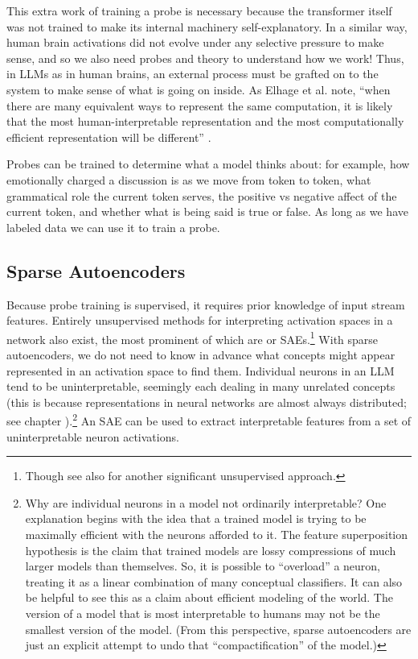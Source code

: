 This extra work of training a probe is necessary because the transformer itself
was not trained to make its internal machinery self-explanatory. In a similar
way, human brain activations did not evolve under any selective pressure to
make sense, and so we also need probes and theory to understand how we work!
Thus, in LLMs as in human brains, an external process must be grafted on to the
system to make sense of what is going on inside. As Elhage et al. note, ``when
there are many equivalent ways to represent the same computation, it is likely
that the most human-interpretable representation and the most computationally
efficient representation will be different'' \cite{elhage2021mathematical}.

Probes can be trained to determine what a model thinks about: for example, how
emotionally charged a discussion is as we move from token to token, what
grammatical role the current token serves, the positive vs negative affect of
the current token, and whether what is being said is true or false. As long as
we have labeled data we can use it to train a probe.

\subsection{Sparse Autoencoders}

Because probe training is supervised, it requires prior knowledge of input
stream features. Entirely unsupervised methods for interpreting activation
spaces in a network also exist, the most prominent of which are
 or SAEs.\footnote{Though see also
\cite{burns2024discovering} for another significant unsupervised approach.}
With sparse autoencoders, we do not need to know in advance what concepts might
appear represented in an activation space to find them. Individual neurons in
an LLM tend to be uninterpretable, seemingly each dealing in many unrelated
concepts \cite{elhage2022superposition, scherlis2025polysemanticity} (this is
because representations in neural networks are almost always distributed; see
chapter ).\footnote{Why are individual neurons in a model not
ordinarily interpretable? One explanation begins with the idea that a trained
model is trying to be maximally efficient with the neurons afforded to it. The
feature superposition hypothesis is the claim that trained models are lossy
compressions of much larger models than themselves. So, it is possible to
``overload'' a neuron, treating it as a linear combination of many conceptual
classifiers. It can also be helpful to see this as a claim about efficient
modeling of the world. The version of a model that is most interpretable to
humans may not be the smallest version of the model. (From this perspective,
sparse autoencoders are just an explicit attempt to undo that
``compactification'' of the model.)} An SAE can be used to extract
interpretable features from a set of uninterpretable neuron activations.

